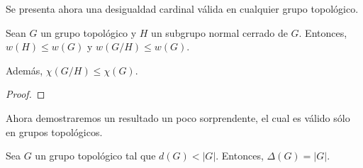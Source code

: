 \documentclass[12pt]{report}
\theoremstyle{largebreak}
\newcommand\abs[1]{\ensuremath{\lvert#1\rvert}}
\begin{document}
    Se presenta ahora una desigualdad cardinal válida en cualquier grupo topológico.
    
    \begin{propo}
        Sean $G$ un grupo topológico y $H$ un subgrupo normal cerrado de $G$. Entonces, $w(H)\leq w(G)$ y $w(G/H)\leq w(G)$.

        Además, $\chi(G/H)\leq\chi(G)$.
    \end{propo}

    \begin{proof}
        
    \end{proof}

    Ahora demostraremos un resultado un poco sorprendente, el cual es válido sólo en grupos topológicos.

    \begin{theor}
        Sea $G$ un grupo topológico tal que $d(G)<\abs{G}$. Entonces, $\Delta(G)=\abs{G}$.
    \end{theor}
\end{document}
